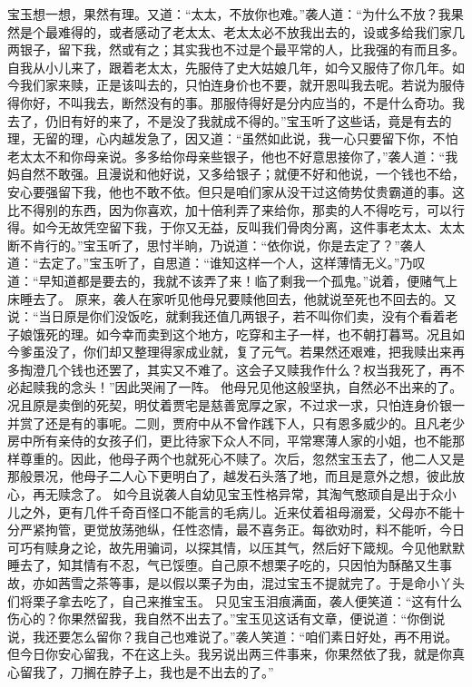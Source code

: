 \documentclass[12pt,oneside]{book}
\begin{document}
宝玉想一想，果然有理。又道：“太太，不放你也难。”袭人道：“为什么不放？我果然是个最难得的，或者感动了老太太、老太太必不放我出去的，设或多给我们家几两银子，留下我，然或有之；其实我也不过是个最平常的人，比我强的有而且多。自我从小儿来了，跟着老太太，先服侍了史大姑娘几年，如今又服侍了你几年。如今我们家来赎，正是该叫去的，只怕连身价也不要，就开恩叫我去呢。若说为服侍得你好，不叫我去，断然没有的事。那服侍得好是分内应当的，不是什么奇功。我去了，仍旧有好的来了，不是没了我就成不得的。”宝玉听了这些话，竟是有去的理，无留的理，心内越发急了，因又道：“虽然如此说，我一心只要留下你，不怕老太太不和你母亲说。多多给你母亲些银子，他也不好意思接你了，”袭人道：“我妈自然不敢强。且漫说和他好说，又多给银子；就便不好和他说，一个钱也不给，安心要强留下我，他也不敢不依。但只是咱们家从没干过这倚势仗贵霸道的事。这比不得别的东西，因为你喜欢，加十倍利弄了来给你，那卖的人不得吃亏，可以行得。如今无故凭空留下我，于你又无益，反叫我们骨肉分离，这件事老太太、太太断不肯行的。”宝玉听了，思忖半晌，乃说道：“依你说，你是去定了？”袭人道：“去定了。”宝玉听了，自思道：“谁知这样一个人，这样薄情无义。”乃叹道：“早知道都是要去的，我就不该弄了来！临了剩我一个孤鬼。”说着，便赌气上床睡去了。
原来，袭人在家听见他母兄要赎他回去，他就说至死也不回去的。又说：“当日原是你们没饭吃，就剩我还值几两银子，若不叫你们卖，没有个看着老子娘饿死的理。如今幸而卖到这个地方，吃穿和主子一样，也不朝打暮骂。况且如今爹虽没了，你们却又整理得家成业就，复了元气。若果然还艰难，把我赎出来再多掏澄几个钱也还罢了，其实又不难了。这会子又赎我作什么？权当我死了，再不必起赎我的念头！”因此哭闹了一阵。
他母兄见他这般坚执，自然必不出来的了。况且原是卖倒的死契，明仗着贾宅是慈善宽厚之家，不过求一求，只怕连身价银一并赏了还是有的事呢。二则，贾府中从不曾作践下人，只有恩多威少的。且凡老少房中所有亲侍的女孩子们，更比待家下众人不同，平常寒薄人家的小姐，也不能那样尊重的。因此，他母子两个也就死心不赎了。次后，忽然宝玉去了，他二人又是那般景况，他母子二人心下更明白了，越发石头落了地，而且是意外之想，彼此放心，再无赎念了。
如今且说袭人自幼见宝玉性格异常，其淘气憨顽自是出于众小儿之外，更有几件千奇百怪口不能言的毛病儿。近来仗着祖母溺爱，父母亦不能十分严紧拘管，更觉放荡弛纵，任性恣情，最不喜务正。每欲劝时，料不能听，今日可巧有赎身之论，故先用骗词，以探其情，以压其气，然后好下箴规。今见他默默睡去了，知其情有不忍，气已馁堕。自己原不想栗子吃的，只因怕为酥酪又生事故，亦如茜雪之茶等事，是以假以栗子为由，混过宝玉不提就完了。于是命小丫头们将栗子拿去吃了，自己来推宝玉。
只见宝玉泪痕满面，袭人便笑道：“这有什么伤心的？你果然留我，我自然不出去了。”宝玉见这话有文章，便说道︰“你倒说说，我还要怎么留你？我自己也难说了。”袭人笑道：“咱们素日好处，再不用说。但今日你安心留我，不在这上头。我另说出两三件事来，你果然依了我，就是你真心留我了，刀搁在脖子上，我也是不出去的了。”
\end{document}
